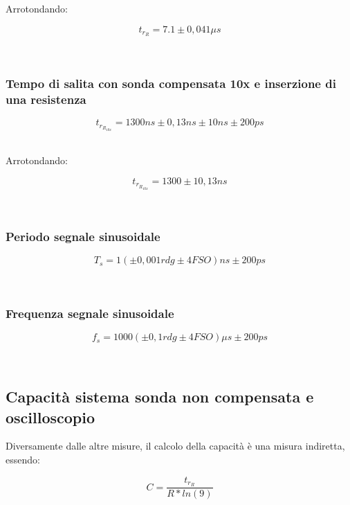 \documentclass[a4paper]{article}
\begin{document}
Arrotondando: 

\begin{Large}
	\begin{equation}
		t_{r_R}= 7.1\pm 0,041 \mu s
	\end{equation}
\end{Large}\\

\subsubsection{Tempo di salita con sonda compensata 10x e inserzione di una resistenza}

\begin{Large}
	\begin{equation}
		{t_{r_{R_{10x}}}}= 1300ns \pm 0,13ns \pm10ns \pm200ps
	\end{equation}
\end{Large}\\

Arrotondando: 

\begin{Large}
	\begin{equation}
		{t_{r_{R_{10x}}}}= 1300\pm 10,13 ns
	\end{equation}
\end{Large}\\

\subsubsection{Periodo segnale sinusoidale}
\begin{Large}
	\begin{equation}
  		{T_s}= 1(\pm 0,001 rdg \pm4 FSO)ns \pm200ps
	\end{equation}
\end{Large}\\

\subsubsection{Frequenza segnale sinusoidale}
\begin{Large}
	\begin{equation}
  		{f_s}= 1000(\pm 0,1 rdg \pm4 FSO)\mu s \pm200ps %
	\end{equation}
\end{Large}\\

\subsection{Capacità sistema sonda non compensata e oscilloscopio}
Diversamente dalle altre misure, il calcolo della capacità è una misura indiretta, essendo: 
\begin{Large}
	\begin{equation}
  		C= \frac{t_{r_R}}{R*ln(9)}
	\end{equation}
\end{Large}\\
\end{document}
